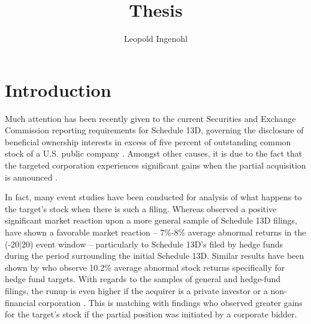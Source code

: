 \documentclass[12pt]{article}
\title{Thesis}
\author{Leopold Ingenohl}
\begin{document}
\maketitle

\section{Introduction}
Much attention has been recently given to the current Securities and Exchange Commission reporting requirements for Schedule 13D, governing the disclosure of beneficial ownership interests in excess of five percent of outstanding common stock of a U.S. public company \citep{Giglia2018}. Amongst other causes, it is due to the fact that the targeted corporation experiences significant gains when the partial acquisition is announced \citep{Akhigbe2007}. %

In fact, many event studies have been conducted for analysis of what happens to the target's stock when there is such a filing. Whereas \citet{Collin-Dufresne2015} observed a positive significant market reaction upon a more general sample of Schedule 13D filings, \citet{Brav2008} have shown a favorable market reaction -- 7\%-8\% average abnormal returns in the (-20|20) event window -- particularly to Schedule 13D's filed by hedge funds during the period surrounding the initial Schedule 13D. Similar results have been shown by \citet{Klein2009} who observe 10.2\% average abnormal stock returns specifically for hedge fund targets. With regards to the samples of general and hedge-fund filings, the runup is even higher if the acquirer is a private investor or a non-financial corporation \citep{Brigida2012}. This is matching with \citet{Akhigbe2007} findings who observed greater gains for the target's stock if the partial position was initiated by a corporate bidder. 
\end{document}
